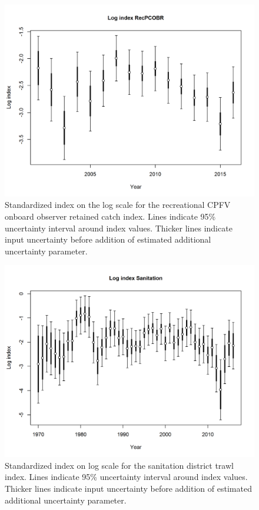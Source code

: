 \documentclass[12pt,]{article}
\begin{document}
\begin{figure}[htbp]
\centering
\includegraphics{r4ss/plots_mod1/index4_logcpuedata_RecPCOBR.png}
\caption{Standardized index on the log scale for the recreational CPFV
onboard observer retained catch index. Lines indicate 95\% uncertainty
interval around index values. Thicker lines indicate input uncertainty
before addition of estimated additional uncertainty parameter.
\label{fig:Fleet12_index4_logcpuedata_RecPCOBR}}
\end{figure}

\FloatBarrier

\begin{figure}[htbp]
\centering
\includegraphics{r4ss/plots_mod1/index4_logcpuedata_Sanitation.png}
\caption{Standardized index on log scale for the sanitation district
trawl index. Lines indicate 95\% uncertainty interval around index
values. Thicker lines indicate input uncertainty before addition of
estimated additional uncertainty parameter.
\label{fig:index4_logcpuedata_Sanitation}}
\end{figure}
\end{document}

